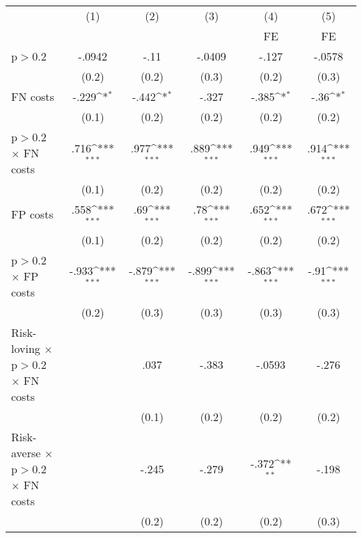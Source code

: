 
\def\sym#1{\ifmmode^{#1}\else\(^{#1}\)\fi}
\begin{tabular}{l*{5}{c}}
\hline\hline
                &\multicolumn{1}{c}{(1)}&\multicolumn{1}{c}{(2)}&\multicolumn{1}{c}{(3)}&\multicolumn{1}{c}{(4)}&\multicolumn{1}{c}{(5)}\\
                &\multicolumn{1}{c}{}&\multicolumn{1}{c}{}&\multicolumn{1}{c}{}&\multicolumn{1}{c}{FE}&\multicolumn{1}{c}{FE}\\
\hline
p$>$0.2         &   -.0942         &     -.11         &   -.0409         &    -.127         &   -.0578         \\
                &    (0.2)         &    (0.2)         &    (0.3)         &    (0.2)         &    (0.3)         \\
FN costs        &    -.229\sym{*}  &    -.442\sym{*}  &    -.327         &    -.385\sym{*}  &     -.36\sym{*}  \\
                &    (0.1)         &    (0.2)         &    (0.2)         &    (0.2)         &    (0.2)         \\
p$>$0.2 $\times$ FN costs&     .716\sym{***}&     .977\sym{***}&     .889\sym{***}&     .949\sym{***}&     .914\sym{***}\\
                &    (0.1)         &    (0.2)         &    (0.2)         &    (0.2)         &    (0.2)         \\
FP costs        &     .558\sym{***}&      .69\sym{***}&      .78\sym{***}&     .652\sym{***}&     .672\sym{***}\\
                &    (0.1)         &    (0.2)         &    (0.2)         &    (0.2)         &    (0.2)         \\
p$>$0.2 $\times$ FP costs&    -.933\sym{***}&    -.879\sym{***}&    -.899\sym{***}&    -.863\sym{***}&     -.91\sym{***}\\
                &    (0.2)         &    (0.3)         &    (0.3)         &    (0.3)         &    (0.3)         \\
Risk-loving $\times$ p$>$0.2 $\times$ FN costs&                  &     .037         &    -.383         &   -.0593         &    -.276         \\
                &                  &    (0.1)         &    (0.2)         &    (0.2)         &    (0.2)         \\
Risk-averse $\times$ p$>$0.2 $\times$ FN costs&                  &    -.245         &    -.279         &    -.372\sym{**} &    -.198         \\
                &                  &    (0.2)         &    (0.2)         &    (0.2)         &    (0.3)         \\

\end{tabular}
